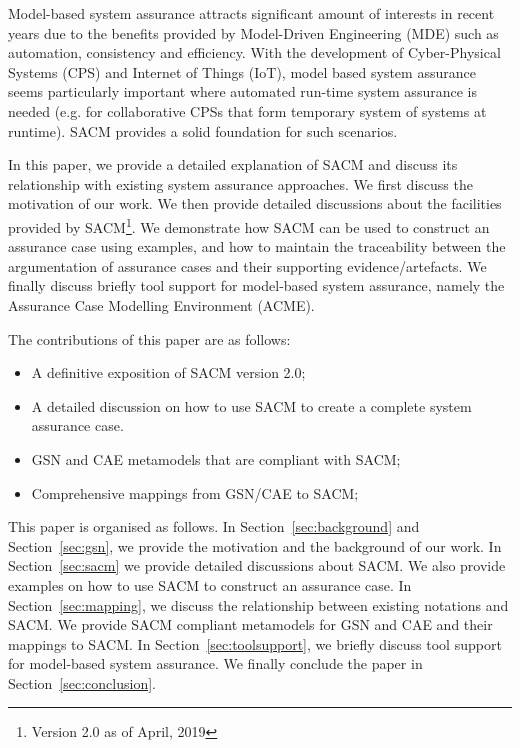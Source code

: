 Model-based system assurance attracts significant amount of interests in recent years due to the benefits provided by Model-Driven Engineering (MDE) such as automation, consistency and efficiency. With the development of Cyber-Physical Systems (CPS) and Internet of Things (IoT), model based system assurance seems particularly important where automated run-time system assurance is needed (e.g. for collaborative CPSs that form temporary system of systems at runtime). SACM provides a solid foundation for such scenarios.



In this paper, we provide a detailed explanation of SACM and discuss its relationship with existing system assurance approaches. We first discuss the motivation of our work. We then provide detailed discussions about the facilities provided by SACM\footnote{Version 2.0 as of April, 2019}. 
We demonstrate how SACM can be used to construct an assurance case using examples, and how to maintain the traceability between the argumentation of assurance cases and their supporting evidence/artefacts. We finally discuss briefly tool support for model-based system assurance, namely the Assurance Case Modelling Environment (ACME).

The contributions of this paper are as follows:
\begin{itemize}
	\item A definitive exposition of SACM version 2.0;
	\item A detailed discussion on how to use SACM to create a complete system assurance case.
	\item GSN and CAE metamodels that are compliant with SACM;
	\item Comprehensive mappings from GSN/CAE to SACM;
\end{itemize}

This paper is organised as follows. In Section~\ref{sec:background} and Section~\ref{sec:gsn}, we provide the motivation and the background of our work. In Section~\ref{sec:sacm} we provide detailed discussions about SACM. We also provide examples on how to use SACM to construct an assurance case. In Section~\ref{sec:mapping}, we discuss the relationship between existing notations and SACM. We provide SACM compliant metamodels for GSN and CAE and their mappings to SACM. In Section~\ref{sec:toolsupport}, we briefly discuss tool support for model-based system assurance. We finally conclude the paper in Section~\ref{sec:conclusion}.

